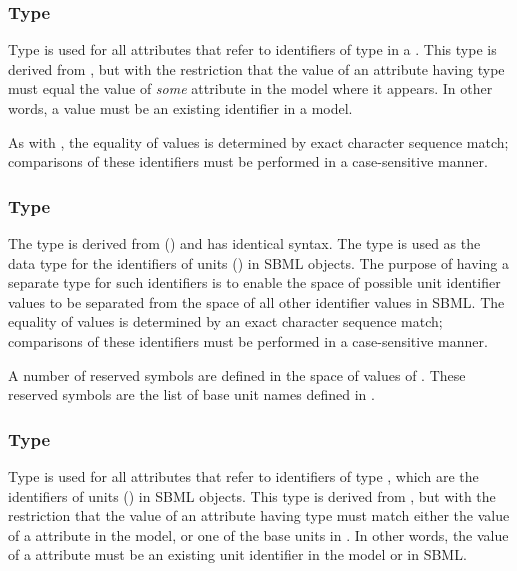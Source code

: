 \subsubsection{Type }
\label{sec:sidref}

Type  is used for all attributes that refer to
identifiers of type  in a \Model {}.  This type is
derived from , but with the restriction that the
value of an attribute having type  must equal the
value of \emph{some}  attribute in the model where
it appears.  In other words, a  value must be an
existing identifier in a model.

As with , the equality of  values
is determined by exact character sequence match; \ie comparisons
of these identifiers must be performed in a case-sensitive manner.


\subsubsection{Type }
\label{sec:unitsid}

The type  is derived from 
() and has identical syntax.  The
 type is used as the data type for the
identifiers of units ()
in SBML objects.  The purpose of having a separate type for such
identifiers is to enable the space of possible unit identifier
values to be separated from the space of all other identifier
values in SBML.  The equality of  values is
determined by an exact character sequence match; \ie comparisons
of these identifiers must be performed in a case-sensitive manner.

A number of reserved symbols are defined in the space of values of
.  These reserved symbols are the list of base
unit names defined in .


\subsubsection{Type }
\label{sec:unitsidref}

Type  is used for all attributes that refer
to identifiers of type , which are the
identifiers of units ()
in SBML objects.  This type is derived from ,
but with the restriction that the value of an attribute having
type  must match either the value of a
 attribute in the model, or one of the
base units in .  In other words,
the value of a  attribute must be an existing
unit identifier in the model or in SBML.

